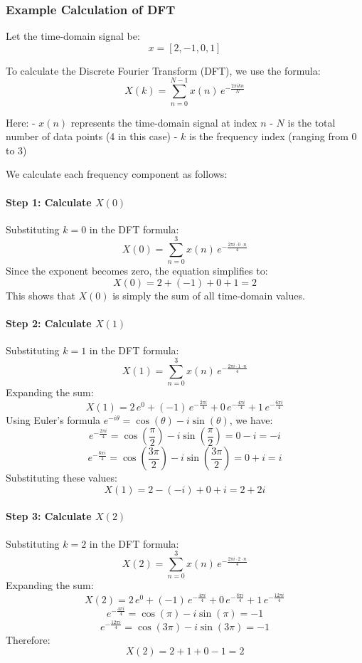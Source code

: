 \documentclass[12pt]{article}
\begin{document}
\subsubsection{Example Calculation of DFT}
Let the time-domain signal be:
\[
x = [2, -1, 0, 1]
\]

To calculate the Discrete Fourier Transform (DFT), we use the formula:
\[
X(k) = \sum_{n=0}^{N-1} x(n) \, e^{-\frac{2\pi ikn}{N}}
\]

Here:
- \(x(n)\) represents the time-domain signal at index \(n\)
- \(N\) is the total number of data points (4 in this case)
- \(k\) is the frequency index (ranging from 0 to 3)

We calculate each frequency component as follows:

\paragraph{Step 1: Calculate \(X(0)\)}
Substituting \(k = 0\) in the DFT formula:
\[
X(0) = \sum_{n=0}^{3} x(n) \, e^{-\frac{2\pi i \cdot 0 \cdot n}{4}}
\]
Since the exponent becomes zero, the equation simplifies to:
\[
X(0) = 2 + (-1) + 0 + 1 = 2
\]
This shows that \(X(0)\) is simply the sum of all time-domain values.

\paragraph{Step 2: Calculate \(X(1)\)}
Substituting \(k = 1\) in the DFT formula:
\[
X(1) = \sum_{n=0}^{3} x(n) \, e^{-\frac{2\pi i \cdot 1 \cdot n}{4}}
\]
Expanding the sum:
\[
X(1) = 2 \, e^{0} + (-1) \, e^{-\frac{2\pi i}{4}} + 0 \, e^{-\frac{4\pi i}{4}} + 1 \, e^{-\frac{6\pi i}{4}}
\]
Using Euler's formula \(e^{-i\theta} = \cos(\theta) - i \sin(\theta)\), we have:
\[
e^{-\frac{2\pi i}{4}} = \cos\left(\frac{\pi}{2}\right) - i \sin\left(\frac{\pi}{2}\right) = 0 - i = -i
\]
\[
e^{-\frac{6\pi i}{4}} = \cos\left(\frac{3\pi}{2}\right) - i \sin\left(\frac{3\pi}{2}\right) = 0 + i = i
\]
Substituting these values:
\[
X(1) = 2 - (-i) + 0 + i = 2 + 2i
\]

\paragraph{Step 3: Calculate \(X(2)\)}
Substituting \(k = 2\) in the DFT formula:
\[
X(2) = \sum_{n=0}^{3} x(n) \, e^{-\frac{2\pi i \cdot 2 \cdot n}{4}}
\]
Expanding the sum:
\[
X(2) = 2 \, e^{0} + (-1) \, e^{-\frac{4\pi i}{4}} + 0 \, e^{-\frac{8\pi i}{4}} + 1 \, e^{-\frac{12\pi i}{4}}
\]
\[
e^{-\frac{4\pi i}{4}} = \cos(\pi) - i \sin(\pi) = -1
\]
\[
e^{-\frac{12\pi i}{4}} = \cos(3\pi) - i \sin(3\pi) = -1
\]
Therefore:
\[
X(2) = 2 + 1 + 0 - 1 = 2
\]
\end{document}
